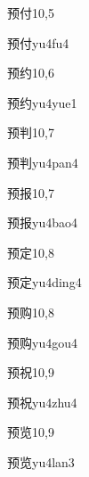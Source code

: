 \begin{entry}{预付}{10,5}
  \begin{phonetics}{预付}{yu4fu4}
  \end{phonetics}
\end{entry}

\begin{entry}{预约}{10,6}
  \begin{phonetics}{预约}{yu4yue1}
  \end{phonetics}
\end{entry}

\begin{entry}{预判}{10,7}
  \begin{phonetics}{预判}{yu4pan4}
  \end{phonetics}
\end{entry}

\begin{entry}{预报}{10,7}
  \begin{phonetics}{预报}{yu4bao4}
  \end{phonetics}
\end{entry}

\begin{entry}{预定}{10,8}
  \begin{phonetics}{预定}{yu4ding4}
  \end{phonetics}
\end{entry}

\begin{entry}{预购}{10,8}
  \begin{phonetics}{预购}{yu4gou4}
  \end{phonetics}
\end{entry}

\begin{entry}{预祝}{10,9}
  \begin{phonetics}{预祝}{yu4zhu4}
  \end{phonetics}
\end{entry}

\begin{entry}{预览}{10,9}
  \begin{phonetics}{预览}{yu4lan3}
  \end{phonetics}
\end{entry}

